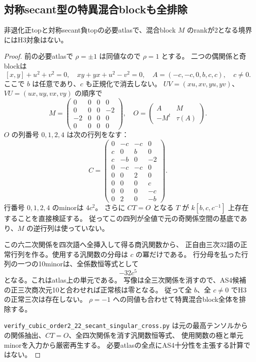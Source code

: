 \subsection{対称secant型の特異混合blockも全排除}
\begin{proposition}
非退化正topと対称secant負topの必要atlasで、混合block $M$ のrankが2となる境界にはH3対象はない。
\end{proposition}
\begin{proof}
前の必要atlasで $\rho=\pm1$ は同値なので $\rho=1$ とする。
二つの偶関係と奇blockは
\[
 [x,y]+u^2+v^2=0,\quad xy+yx+u^2-v^2=0,\quad
 A=(-c,-c,0,b,c,c),\quad c\ne0.
\]
ここで $b$ は任意であり、$c$ も正規化で消去しない。
$UV=(xu,xv,yu,yv)$、$VU=(ux,uy,vx,vy)$ の順序で
\[
 M=\begin{pmatrix}0&0&0&0\\0&0&0&-2\\-2&0&0&0\\0&0&0&0\end{pmatrix},\quad
 O=\begin{pmatrix}A&M\\-M^t&\tau(A)\end{pmatrix}.
\]
$O$ の列番号 $0,1,2,4$ は次の行列をなす：
\[
 C=\begin{pmatrix}
 0&-c&-c&0\\c&0&b&0\\c&-b&0&-2\\0&-c&-c&0\\
 0&0&2&0\\0&0&0&c\\0&0&0&-c\\0&2&0&-b
 \end{pmatrix}.
\]
行番号 $0,1,2,4$ のminorは $4c^2$。
さらに $C T=O$ となる $T$ が $k[b,c,c^{-1}]$ 上存在することを直接検証する。
従ってこの四列が全値で元の奇関係空間の基底であり、$M$ の逆行列は使っていない。

この六二次関係を四次語へ全挿入して得る商汎関数から、
正自由三次32語の正常行列を作る。使用する汎関数の分母は $c$ の冪だけである。
行分母を払った行列の一つの10minorは、全係数恒等式として
\[
 -32c^5
\]
となる。これはatlas上の単元である。
写像は全三次関係を消すので、AS4候補の正三次商次元10と合わせれば正常核は零となる。
従って全 $b$、全 $c\ne0$ でH3の正常三次は存在しない。
$\rho=-1$ への同値も合わせて特異混合block全体を排除する。

\texttt{verify\_cubic\_order2\_22\_secant\_singular\_cross.py}
は元の最高テンソルからの関係抽出、$C T=O$、全四次関係を消す汎関数恒等式、
使用関数の極と単元minorを入力から厳密再生する。
必要atlasの全点にAS4十分性を主張する計算ではない。
\end{proof}
